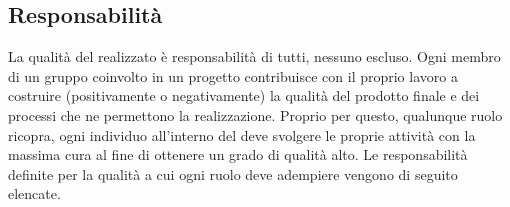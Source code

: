 \documentclass[a4paper, titlepage]{article}
\begin{document}
\subsection{Responsabilità} 
\label{sec:repo}
La qualità del  realizzato è responsabilità di tutti, nessuno escluso. Ogni membro di un gruppo coinvolto in un progetto  contribuisce con il proprio lavoro a costruire (positivamente o negativamente) la qualità del prodotto finale e dei processi che ne permettono la realizzazione.
\newline Proprio per questo, qualunque ruolo ricopra, ogni individuo all'interno del  deve svolgere le proprie attività con la massima cura al fine di ottenere un grado di qualità alto.
\newline Le responsabilità definite per la qualità a cui ogni ruolo deve adempiere vengono di seguito elencate.
\end{document}
